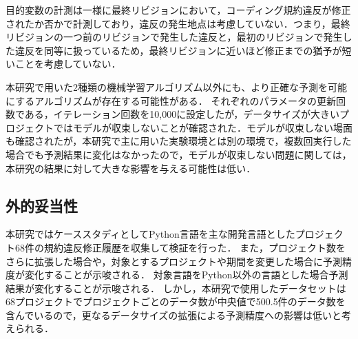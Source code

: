 \documentclass[submit,noauthor,ses,dvipdfmx]{ipsj}
\begin{document}
目的変数の計測は一様に最終リビジョンにおいて，コーディング規約違反が修正されたか否かで計測しており，違反の発生地点は考慮していない．つまり，最終リビジョンの一つ前のリビジョンで発生した違反と，最初のリビジョンで発生した違反を同等に扱っているため，最終リビジョンに近いほど修正までの猶予が短いことを考慮していない．

本研究で用いた2種類の機械学習アルゴリズム以外にも、より正確な予測を可能にするアルゴリズムが存在する可能性がある．
それぞれのパラメータの更新回数である，イテレーション回数を10,000に設定したが，データサイズが大きいプロジェクトではモデルが収束しないことが確認された．モデルが収束しない場面も確認されたが，本研究で主に用いた実験環境とは別の環境で，複数回実行した場合でも予測結果に変化はなかったので，モデルが収束しない問題に関しては，本研究の結果に対して大きな影響を与える可能性は低い．


\subsection{外的妥当性}

本研究ではケーススタディとしてPython言語を主な開発言語としたプロジェクト68件の規約違反修正履歴を収集して検証を行った．
また，プロジェクト数をさらに拡張した場合や，対象とするプロジェクトや期間を変更した場合に予測精度が変化することが示唆される．
対象言語をPython以外の言語とした場合予測結果が変化することが示唆される．
しかし，本研究で使用したデータセットは68プロジェクトでプロジェクトごとのデータ数が中央値で500.5件のデータ数を含んでいるので，更なるデータサイズの拡張による予測精度への影響は低いと考えられる．
\end{document}
